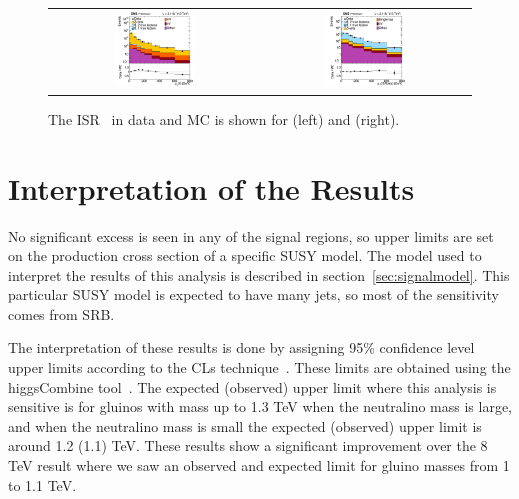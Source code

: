 \begin{figure}[!ht]
\begin{center}
\begin{tabular}{cc}
\includegraphics[width=0.4\textwidth]{results/figs/CMS-PAS-SUS-15-007_Figure_010-a.pdf} &
\includegraphics[width=0.4\textwidth]{results/figs/CMS-PAS-SUS-15-007_Figure_010-b.pdf} \\
\end{tabular}
\caption{
\label{fig:isrmodeling}
The ISR \pt\ in data and MC is shown for \zjets(left) and \ttbar(right).
}
\end{center}
\end{figure}

\clearpage

\section{Interpretation of the Results}
No significant excess is seen in any of the signal regions, so upper limits are set on the production cross section of a specific SUSY model.
The model used to interpret the results of this analysis is described in section~\ref{sec:signalmodel}.
This particular SUSY model is expected to have many jets, so most of the sensitivity comes from SRB.

The interpretation of these results is done by assigning 95\% confidence level upper limits according to the CLs technique~\cite{Read:2002hq}\cite{Junk:1999kv}.
These limits are obtained using the higgsCombine tool~\cite{ATL-PHYS-PUB-2011-011}.
The expected (observed) upper limit where this analysis is sensitive is for gluinos with mass up to 1.3 TeV when the neutralino mass is large,
and when the neutralino mass is small the expected (observed) upper limit is around 1.2 (1.1) TeV.
These results show a significant improvement over the 8 TeV result where we saw an observed and expected limit for gluino masses from 1 to 1.1 TeV.

